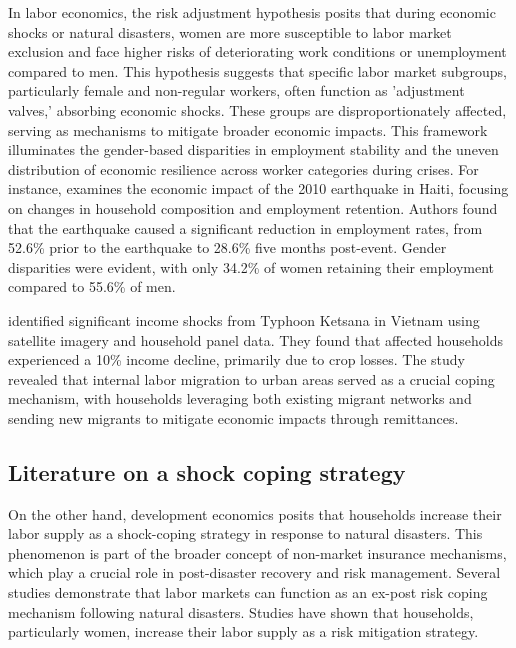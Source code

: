\documentclass[12pt,halfline,a4paper]{ouparticle}
\begin{document}
In labor economics, the risk adjustment hypothesis posits that during economic shocks or natural disasters, women are more susceptible to labor market exclusion and face higher risks of deteriorating work conditions or unemployment compared to men. This hypothesis suggests that specific labor market subgroups, particularly female and non-regular workers, often function as 'adjustment valves,' absorbing economic shocks. These groups are disproportionately affected, serving as mechanisms to mitigate broader economic impacts. This framework illuminates the gender-based disparities in employment stability and the uneven distribution of economic resilience across worker categories during crises. For instance, \citet{Kim2014ARetention} examines the economic impact of the 2010 earthquake in Haiti, focusing on changes in household composition and employment retention. Authors found that the earthquake caused a significant reduction in employment rates, from 52.6\% prior to the earthquake to 28.6\% five months post-event. Gender disparities were evident, with only 34.2\% of women retaining their employment compared to 55.6\% of men. 



\citet{Groger2016InternalTyphoon} identified significant income shocks from Typhoon Ketsana in Vietnam using satellite imagery and household panel data. They found that affected households experienced a 10\% income decline, primarily due to crop losses. The study revealed that internal labor migration to urban areas served as a crucial coping mechanism, with households leveraging both existing migrant networks and sending new migrants to mitigate economic impacts through remittances.

\subsection{Literature on a shock coping strategy}
\label{sec5.1}

On the other hand, development economics posits that households increase their labor supply as a shock-coping strategy in response to natural disasters. This phenomenon is part of the broader concept of non-market insurance mechanisms, which play a crucial role in post-disaster recovery and risk management. Several studies demonstrate that labor markets can function as an ex-post risk coping mechanism following natural disasters. Studies have shown that households, particularly women, increase their labor supply as a risk mitigation strategy. 
\end{document}
